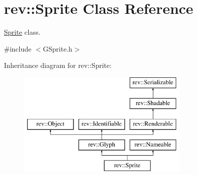\hypertarget{classrev_1_1_sprite}{}\section{rev\+::Sprite Class Reference}
\label{classrev_1_1_sprite}


\mbox{\hyperlink{classrev_1_1_sprite}{Sprite}} class.  




{\ttfamily \#include $<$G\+Sprite.\+h$>$}

Inheritance diagram for rev\+::Sprite\+:\begin{figure}[H]
\begin{center}
\leavevmode
\includegraphics[height=5.000000cm]{classrev_1_1_sprite}
\end{center}
\end{figure}
